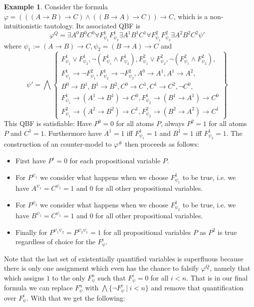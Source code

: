 \documentclass[a4paper,12pt]{report}
\theoremstyle{definition}
\theoremstyle{definition}
\theoremstyle{definition}
\theoremstyle{definition}
\theoremstyle{definition}
\theoremstyle{definition}
\newtheorem{example}[theorem]{Example}
\theoremstyle{definition}
\begin{document}
	\begin{example}
		Consider the formula $\varphi = (((A\to B)\to C)\wedge((B\to A)\to C))\to C$, which is a non-intuitionistic tautology. Its associated QBF is $$\varphi^Q = \exists A^0B^0C^0\forall F_{\psi_1}^1F_{\psi_2}^1 \exists A^1B^1C^1\forall F_{\psi_1}^2F_{\psi_2}^2 \exists A^2B^2C^2\psi'$$where $\psi_1 := (A\to B)\to C, \psi_2 = (B\to A)\to C$ and $$\psi' = \bigwedge\left\{\begin{matrix}
			F^1_{\psi_1}\vee F^1_{\psi_2}, \neg(F^1_{\psi_1}\wedge F^1_{\psi_2}), F^2_{\psi_1}\vee F^2_{\psi_2},\neg(F^2_{\psi_1}\wedge F^2_{\psi_2}),\\F^1_{\psi_1}\to\neg F^2_{\psi_1},F^1_{\psi_2}\to\neg F^2_{\psi_2}, A^0\to A^1,A^1\to A^2,
			\\B^0\to B^1, B^1\to B^2, C^0\to C^1, C^1\to C^2,\neg C^0, \\
			F^1_{\psi_1}\to (A^1\to B^1)\to C^0, F^1_{\psi_2}\to(B^1\to A^1)\to C^0\\
			F^2_{\psi_1}\to (A^2\to B^2)\to C^1, F^2_{\psi_2}\to(B^2\to A^2)\to C^1
		\end{matrix}\right\}$$
		This QBF is satisfiable: Have $P^0 = 0$ for all atoms $P$, always $P^2 = 1$ for all atoms $P$ and $C^1 = 1$. Furthermore have $A^1 = 1$ iff $F^1_{\psi_1} = 1$ and $B^1 = 1$ iff $F^1_{\psi_2} = 1$. The construction of an counter-model to $\varphi^\#$ then proceeds as follows:
		\begin{itemize}
			\item First have $P^\epsilon = 0$ for each propositional variable $P$.
			\item For $P^{\psi_1}$ we consider what happens when we choose $F^1_{\psi_1}$ to be true, i.e. we have $A^{\psi_1} = C^{\psi_1} = 1$ and $0$ for all other propositional variables.
			\item For $P^{\psi_2}$ we consider what happens when we choose $F^1_{\psi_2}$ to be true, i.e. we have $B^{\psi_1} = C^{\psi_1} = 1$ and $0$ for all other propositional variables.
			\item Finally for $P^{\psi_1\psi_2} = P^{\psi_2\psi_1} = 1$ for all propositional variables $P$ as $P^2$ is true regardless of choice for the $F^i_\psi$.
		\end{itemize}
	\end{example}	
	
	Note that the last set of existentially quantified variables is superfluous because there is only one assignment which even has the chance to falsify $\varphi^Q$, namely that which assigns $1$ to the only $F_\psi^n$ such that $F_\psi^i = 0$ for all $i < n$. That is in our final formula we can replace $F_\psi^n$ with $\bigwedge\{\neg F_\psi^i\:|\:i < n\}$ and remove that quantification over $F_\psi^i$. With that we get the following:
	
\end{document}
